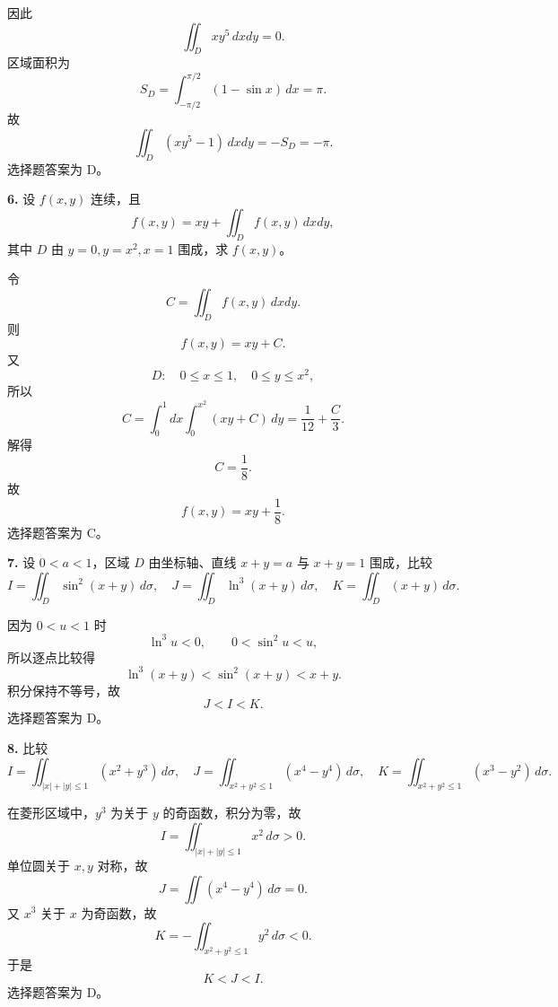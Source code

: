\begin{solutionblock}
因此
\[
\iint_D xy^5\,dxdy=0.
\]
区域面积为
\[
S_D=\int_{-\pi/2}^{\pi/2}(1-\sin x)\,dx=\pi.
\]
故
\[
\iint_D(xy^5-1)\,dxdy=-S_D=\boxed{-\pi}.
\]
选择题答案为 D。
\end{solutionblock}

\begin{problemblock}
\textbf{6.} 设 \(f(x,y)\) 连续，且
\[
f(x,y)=xy+\iint_D f(x,y)\,dxdy,
\]
其中 \(D\) 由 \(y=0,y=x^2,x=1\) 围成，求 \(f(x,y)\)。
\end{problemblock}

\begin{solutionblock}
令
\[
C=\iint_D f(x,y)\,dxdy.
\]
则
\[
f(x,y)=xy+C.
\]
又
\[
D:\quad 0\le x\le1,\quad 0\le y\le x^2,
\]
所以
\[
C=\int_0^1dx\int_0^{x^2}(xy+C)\,dy
=\frac1{12}+\frac{C}{3}.
\]
解得
\[
C=\frac18.
\]
故
\[
\boxed{f(x,y)=xy+\frac18}.
\]
选择题答案为 C。
\end{solutionblock}

\begin{problemblock}
\textbf{7.} 设 \(0<a<1\)，区域 \(D\) 由坐标轴、直线 \(x+y=a\) 与 \(x+y=1\) 围成，比较
\[
I=\iint_D\sin^2(x+y)\,d\sigma,\quad
J=\iint_D\ln^3(x+y)\,d\sigma,\quad
K=\iint_D(x+y)\,d\sigma.
\]
\end{problemblock}

\begin{solutionblock}
因为 \(0<u<1\) 时
\[
\ln^3u<0,\qquad 0<\sin^2u<u,
\]
所以逐点比较得
\[
\ln^3(x+y)<\sin^2(x+y)<x+y.
\]
积分保持不等号，故
\[
\boxed{J<I<K}.
\]
选择题答案为 D。
\end{solutionblock}

\begin{problemblock}
\textbf{8.} 比较
\[
I=\iint_{|x|+|y|\le1}(x^2+y^3)\,d\sigma,\quad
J=\iint_{x^2+y^2\le1}(x^4-y^4)\,d\sigma,\quad
K=\iint_{x^2+y^2\le1}(x^3-y^2)\,d\sigma.
\]
\end{problemblock}

\begin{solutionblock}
在菱形区域中，\(y^3\) 为关于 \(y\) 的奇函数，积分为零，故
\[
I=\iint_{|x|+|y|\le1}x^2\,d\sigma>0.
\]
单位圆关于 \(x,y\) 对称，故
\[
J=\iint(x^4-y^4)\,d\sigma=0.
\]
又 \(x^3\) 关于 \(x\) 为奇函数，故
\[
K=-\iint_{x^2+y^2\le1}y^2\,d\sigma<0.
\]
于是
\[
\boxed{K<J<I}.
\]
选择题答案为 D。
\end{solutionblock}

